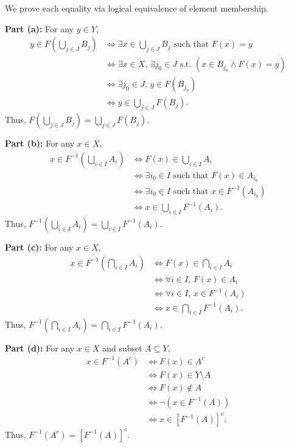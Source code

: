 \documentclass[12pt, a4paper]{article}
\makeatletter
\theoremstyle{break}
\renewenvironment{proof}[1][\proofname]{\par
  \pushQED{\qed}%
  \normalfont \topsep6\p@\@plus6\p@\relax
  \trivlist
  \item[\hskip\labelsep\bfseries #1\@addpunct{.}]\mbox{}\newline\ignorespaces
}{%
  \popQED\endtrivlist\@endpefalse
}
\newenvironment{solution}{\begin{proof}[Solution]}{\end{proof}}
\makeatother
\begin{document}
\begin{solution}
We prove each equality via logical equivalence of element membership.

\textbf{Part (a):} For any \(y \in Y\),
\begin{align*}
y \in F\left(\bigcup_{j \in J} B_j\right) &\iff \exists x \in \bigcup_{j \in J} B_j \text{ such that } F(x) = y \\
&\iff \exists x \in X, \, \exists j_0 \in J \text{ s.t. } (x \in B_{j_0} \land F(x) = y) \\
&\iff \exists j_0 \in J, \, y \in F(B_{j_0}) \\
&\iff y \in \bigcup_{j \in J} F(B_j).
\end{align*}
Thus, \(F\left(\bigcup_{j \in J} B_j\right) = \bigcup_{j \in J} F(B_j)\).

\textbf{Part (b):} For any \(x \in X\),
\begin{align*}
x \in F^{-1}\left(\bigcup_{i \in I} A_i\right) &\iff F(x) \in \bigcup_{i \in I} A_i \\
&\iff \exists i_0 \in I \text{ such that } F(x) \in A_{i_0} \\
&\iff \exists i_0 \in I \text{ such that } x \in F^{-1}(A_{i_0}) \\
&\iff x \in \bigcup_{i \in I} F^{-1}(A_i).
\end{align*}
Thus, \(F^{-1}\left(\bigcup_{i \in I} A_i\right) = \bigcup_{i \in I} F^{-1}(A_i)\).

\textbf{Part (c):} For any \(x \in X\),
\begin{align*}
x \in F^{-1}\left(\bigcap_{i \in I} A_i\right) &\iff F(x) \in \bigcap_{i \in I} A_i \\
&\iff \forall i \in I, \, F(x) \in A_i \\
&\iff \forall i \in I, \, x \in F^{-1}(A_i) \\
&\iff x \in \bigcap_{i \in I} F^{-1}(A_i).
\end{align*}
Thus, \(F^{-1}\left(\bigcap_{i \in I} A_i\right) = \bigcap_{i \in I} F^{-1}(A_i)\).

\textbf{Part (d):} For any \(x \in X\) and subset \(A \subseteq Y\),
\begin{align*}
x \in F^{-1}(A^c) &\iff F(x) \in A^c \\
&\iff F(x) \in Y \setminus A \\
&\iff F(x) \notin A \\
&\iff \neg(x \in F^{-1}(A)) \\
&\iff x \in [F^{-1}(A)]^c.
\end{align*}
Thus, \(F^{-1}(A^c) = [F^{-1}(A)]^c\).
\end{solution}
\end{document}

